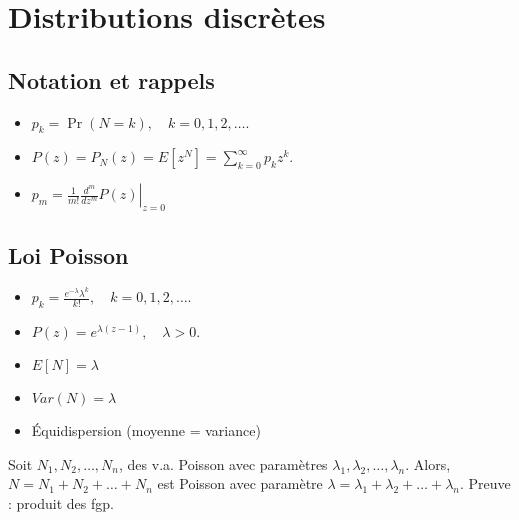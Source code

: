 \chapter{Distributions discrètes}

\section{Notation et rappels}

\begin{itemize}
	\item $\displaystyle p_k = \Pr(N = k), \quad k = 0, 1, 2, \dots .$
	\item $\displaystyle P(z) = P_N(z) = E\left[z^N\right] = \sum_{k = 0}^{\infty}p_k z^k.$
	\item $\displaystyle p_m = \left.\frac{1}{m!} \frac{d^m}{dz^m}P(z)\right\vert_{z = 0}$
\end{itemize}

\section{Loi Poisson}

\begin{itemize}
	\item $\displaystyle p_k= \frac{e^{-\lambda}\lambda^k}{k!}, \quad k = 0, 1, 2, \dots.$
	\item $\displaystyle P(z) = e^{\lambda(z - 1)}, \quad \lambda > 0.$
	\item $E[N] = \lambda$
	\item $Var(N) = \lambda$
	\item Équidispersion (moyenne = variance)
\end{itemize}

\begin{theoreme}{}{}
	Soit $N_1, N_2, \dots, N_n$, des v.a. Poisson avec paramètres $\lambda_1, \lambda_2, \dots, \lambda_n$. Alors, $N = N_1 + N_2 + \dots + N_n$ est Poisson avec paramètre $\lambda = \lambda_1 + \lambda_2 + \dots + \lambda_n$.
	\tcblower
	Preuve : produit des fgp.
\end{theoreme}

